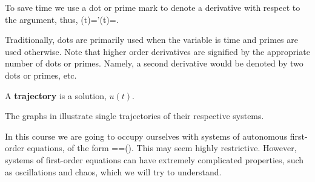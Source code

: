 \begin{defin}
To save time we use a dot or prime mark to denote a derivative with respect to the argument, thus,
\bb
{}(t)='(t)=.
\ee
\end{defin}
Traditionally, dots are primarily used when the variable is time and primes are used otherwise. Note that higher order derivatives are signified by the appropriate number of dots or primes. Namely, a second derivative would be denoted by two dots or primes, etc.

\begin{defin}
A \textbf{trajectory} is a solution, $u(t)$.
\end{defin}
The graphs in  illustrate single trajectories of their respective systems.



In this course we are going to occupy ourselves with systems of autonomous first-order equations, of the form
\bb
{}==().\label{ODE}
\ee
This may seem highly restrictive. However, systems of first-order equations can have extremely complicated properties, such as oscillations and chaos, which we will try to understand.

